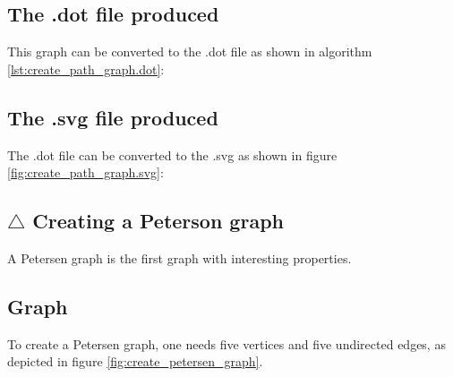 \subsection{The .dot file produced}
\label{subsec:create_path_graph.dot}

This graph can be converted to the .dot file 
as shown in algorithm \ref{lst:create_path_graph.dot}:

%
%
%

\subsection{The .svg file produced}
\label{subsec:create_path_graph.svg}

The .dot file can be converted to the .svg 
as shown in figure \ref{fig:create_path_graph.svg}:

%
%

\subsection{$\triangle$ Creating a Peterson graph}
\label{subsec:create_petersen_graph}

A Petersen graph is the first graph with interesting properties.

\subsection{Graph}

To create a Petersen graph, one needs five vertices and five undirected
 edges, as depicted in figure 
\ref{fig:create_petersen_graph}.

